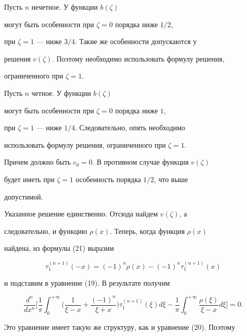 Пусть $n$ нечетное. У функции $b(\zeta)$


могут быть особенности при $\zeta = 0$ порядка ниже $1/2$,


при $\zeta = 1$ --- ниже $3/4$. Такие же особенности допускаются у


решения $v(\zeta)$. Поэтому необходимо использовать формулу решения,


ограниченного при $\zeta=1$.





Пусть $n$ четное. У функции $ b(\zeta)$


могут быть особенности при $\zeta = 0$ порядка ниже $1$,


при $\zeta = 1$ --- ниже $1/4$. Следовательно, опять необходимо


использовать формулу решения, ограниченного при $\zeta=1$.


Причем должно быть $c_0=0$. В противном случае функция $v(\zeta)$


будет иметь при $\zeta=1$ особенность порядка $1/2$, что выше


допустимой.





Указанное решение единственно. Отсюда найдем $v(\zeta)$, а


следовательно, и функцию $\rho(x)$. Теперь, когда функция $\rho(x) $


найдена, из формулы (21) выразим


\begin{equation}


\tau_1^{(n+1)}(-x) = (-1)^n\rho(x)-(-1)^n


\tau_1^{(n+1)}(x)


\end{equation}


и подставим в уравнение (19). В результате получим


$$


\frac{d^n}{dx^n}\biggl[\frac{1}{\pi}\int^{+\infty}_0


\biggl(\frac{1}{\xi-x}+\frac{(-1)^n}{\xi+x}\biggr)\tau_1^{(n+


1)}(\xi)d\xi-


\frac{1}{\pi}\int^{+\infty}_0\frac{\rho(\xi)}{\xi-x}d\xi\biggr]=0.


$$





Это уравнение имеет такую же структуру, как и уравнение (20). Поэтому


